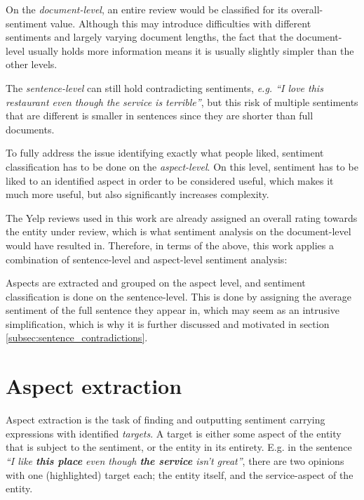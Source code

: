 \documentclass[a4paper,11pt]{kth-mag}
\begin{document}
On the \emph{document-level}, an entire review would be classified for
its overall-sentiment value\cite[Chapter~1.2]{liu2012sentiment}.
Although this may introduce difficulties with different sentiments
and largely varying document lengths, the fact that the document-level usually holds more information
means it is usually slightly simpler than the other levels.

The \emph{sentence-level} can still hold contradicting sentiments,
\emph{e.g. ``I love this restaurant even though the service is terrible''},
but this risk of multiple sentiments that are different is smaller in sentences
since they are shorter than full documents.

To fully address the issue identifying exactly what people liked,
sentiment classification has to be done on the \emph{aspect-level}.
On this level, sentiment has to be liked to an identified aspect in order to be considered
useful, which makes it much more useful, but also significantly increases complexity\cite[Chapter~1.2]{liu2012sentiment}.

The Yelp reviews used in this work are already assigned an overall rating towards the entity under
review, which is what sentiment analysis on the document-level would have resulted in.
Therefore, in terms of the above, this work applies a combination of sentence-level and aspect-level
sentiment analysis:

Aspects are extracted and grouped on the aspect level, and sentiment classification is done on
the sentence-level. This is done by assigning the average sentiment of the full sentence they appear in,
which may seem as an intrusive simplification, which is why it is
further discussed and motivated in section \ref{subsec:sentence_contradictions}.







\chapter{Aspect extraction}

Aspect extraction is the task of finding and outputting sentiment carrying expressions
with identified \emph{targets}. A target is either some aspect of the entity that is
subject to the sentiment, or the entity in its entirety. E.g. in the sentence
\emph{``I like \textbf{this place} even though \textbf{the service} isn't great''},
there are two opinions with one (highlighted) target each; the entity itself, and the
service-aspect of the entity.
\end{document}
